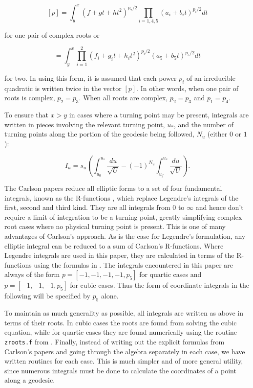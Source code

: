 \documentclass[apj]{emulateapj}
\begin{document}
\begin{equation}\label{carlsoncplex}
 [p] = \int_y^x (f+g t+h t^2)^{p_2/2} \prod_{i=1,4,5} (a_i+b_i t)^{p_i/2} dt
\end{equation}

\noindent for one pair of complex roots or

\begin{equation}
 [p] = \int_y^x \prod_{i=1}^{2} (f_i+g_i t+h_i t^2)^{p_i/2} (a_5+b_5 t)^{p_5/2} dt
\end{equation}

\noindent for two. In using this form, it is assumed that each power $p_i$ of an irreducible quadratic is written twice in the vector $[p]$. In other words, when one pair of roots is complex, $p_2=p_3$. When all roots are complex, $p_2=p_3$ and $p_1=p_4$.

To ensure that $x > y$ in cases where a turning point may be present, integrals are written in pieces involving the relevant turning point, $u_*$, and the number of turning points along the portion of the geodesic being followed, $N_u$ (either $0$ or $1$):

\begin{equation}\label{iutp}
 I_u = s_u \left (\int_{u_0}^{u_*} \frac{du}{\sqrt{U}} - (-1)^{N_u} \int_{u_f}^{u_*} \frac{du}{\sqrt{U}} \right).
\end{equation}

The Carlson papers reduce all elliptic forms to a set of four fundamental integrals, known as the R-functions \citep{numrecipes}, which replace Legendre's integrals of the first, second and third kind. They are all integrals from $0$ to $\infty$ and hence don't require a limit of integration to be a turning point, greatly simplifying complex root cases where no physical turning point is present. This is one of many advantages of Carlson's approach. As is the case for Legendre's formulation, any elliptic integral can be reduced to a sum of Carlson's R-functions. Where Legendre integrals are used in this paper, they are calculated in terms of the R-functions using the formulas in \citet{numrecipes}. The integrals encountered in this paper are always of the form $p=[-1,-1,-1,-1,p_5]$ for quartic cases and $p=[-1,-1,-1,p_5]$ for cubic cases. Thus the form of coordinate integrals in the following will be specified by $p_5$ alone.
 
To maintain as much generality as possible, all integrals are written as above in terms of their roots. In cubic cases the roots are found from solving the cubic equation, while for quartic cases they are found numerically using the routine \texttt{zroots.f} from \citet{numrecipes}. Finally, instead of writing out the explicit formulas from Carlson's papers and going through the algebra separately in each case, we have written routines for each case. This is much simpler and of more general utility, since numerous integrals must be done to calculate the coordinates of a point along a geodesic.
\end{document}

